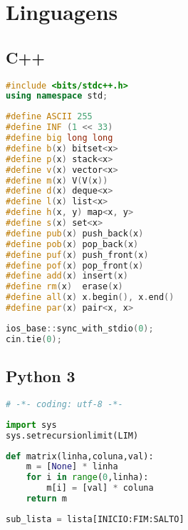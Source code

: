 \chapter{Linguagens}
\section{C++}
\begin{lstlisting}[language=C++, title={Importar a STL inteira}]
#include <bits/stdc++.h>
using namespace std;
\end{lstlisting}

\begin{lstlisting}[language=C++, title={Acelerar digitação}]
#define ASCII 255
#define INF (1 << 33)
#define big long long
#define b(x) bitset<x>
#define p(x) stack<x>
#define v(x) vector<x>
#define m(x) V(V(x))
#define d(x) deque<x>
#define l(x) list<x>
#define h(x, y) map<x, y>
#define s(x) set<x>
#define pub(x) push_back(x)
#define pob(x) pop_back(x)
#define puf(x) push_front(x)
#define pof(x) pop_front(x)
#define add(x) insert(x)
#define rm(x)  erase(x)
#define all(x) x.begin(), x.end()
#define par(x) pair<x, x>
\end{lstlisting}

\begin{lstlisting}[language=C++, title={Acelerar I/O sem scanf}]
ios_base::sync_with_stdio(0);
cin.tie(0);
\end{lstlisting}
\newpage

\section{Python 3}
\begin{lstlisting}[language=Python, title={Codificação}]
# -*- coding: utf-8 -*-
\end{lstlisting}

\begin{lstlisting}[language=Python, title={Tamanho da Pilha de Recursão}]
import sys
sys.setrecursionlimit(LIM)
\end{lstlisting}

\begin{lstlisting}[language=Python, title={Matriz}]
def matrix(linha,coluna,val):
	m = [None] * linha
	for i in range(0,linha):
		m[i] = [val] * coluna
	return m
\end{lstlisting}

\begin{lstlisting}[language=Python, title={Cortar Lista ou String }] 
sub_lista = lista[INICIO:FIM:SALTO]
\end{lstlisting}

